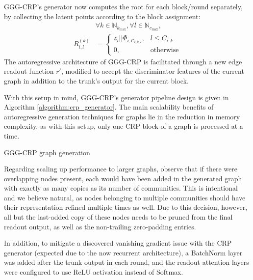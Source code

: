GGG-CRP's generator now computes the root for each block/round separately, by collecting the latent points according to the block assignment:
\begin{align*}
&\forall k \in \mathbb{N}_{k_{\max}}, \forall l \in \mathbb{N}_{c_{\max}}, \\
R_{i,l}^{(k)} &= \begin{cases} z_i||\Phi_{i,\mathcal{C}_{i,k,l}}, & l \leq C_{i,k} \\ 0, & \text{otherwise} \end{cases}
\end{align*}
The autoregressive architecture of GGG-CRP is facilitated through a new edge readout function $r'$, modified to accept the discriminator features of the current graph in addition to the trunk's output for the current block. 

With this setup in mind, GGG-CRP's generator pipeline design is given in Algorithm \ref{algorithm:crp_generator}. The main scalability benefits of autoregressive generation techniques for graphs lie in the reduction in memory complexity, as with this setup, only one CRP block of a graph is processed at a time.

\begin{algorithm}[H]
\caption{GGG-CRP graph generation}
\label{algorithm:crp_generator}
\begin{algorithmic}
\ENDFOR
{}
\end{algorithmic}
\end{algorithm} 

Regarding scaling up performance to larger graphs, observe that if there were overlapping nodes present, each would have been added in the generated graph with exactly as many copies as its number of communities. This is intentional and we believe natural, as nodes belonging to multiple communities should have their representation refined multiple times as well. Due to this decision, however, all but the last-added copy of these nodes needs to be pruned from the final readout output, as well as the non-trailing zero-padding entries.

In addition, to mitigate a discovered vanishing gradient issue with the CRP generator (expected due to the now recurrent architecture), a BatchNorm layer was added after the trunk output in each round, and the readout attention layers were configured to use ReLU activation instead of Softmax.

